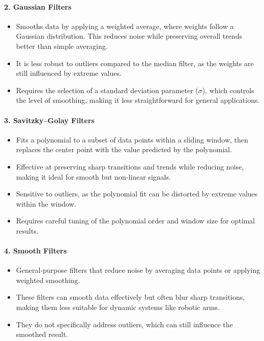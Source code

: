 \documentclass[12pt]{article}
\begin{document}
\paragraph{2. Gaussian Filters}
\begin{itemize}
    \item Smooths data by applying a weighted average, where weights follow a Gaussian distribution. This reduces noise while preserving overall trends better than simple averaging.
    \item It is less robust to outliers compared to the median filter, as the weights are still influenced by extreme values.
    \item Requires the selection of a standard deviation parameter (\(\sigma\)), which controls the level of smoothing, making it less straightforward for general applications.
\end{itemize}

\paragraph{3. Savitzky–Golay Filters}
\begin{itemize}
    \item Fits a polynomial to a subset of data points within a sliding window, then replaces the center point with the value predicted by the polynomial.
    \item Effective at preserving sharp transitions and trends while reducing noise, making it ideal for smooth but non-linear signals.
    \item Sensitive to outliers, as the polynomial fit can be distorted by extreme values within the window.
    \item Requires careful tuning of the polynomial order and window size for optimal results.
\end{itemize}

\paragraph{4. Smooth Filters}
\begin{itemize}
    \item General-purpose filters that reduce noise by averaging data points or applying weighted smoothing.
    \item These filters can smooth data effectively but often blur sharp transitions, making them less suitable for dynamic systems like robotic arms.
    \item They do not specifically address outliers, which can still influence the smoothed result.
\end{itemize}
\end{document}
